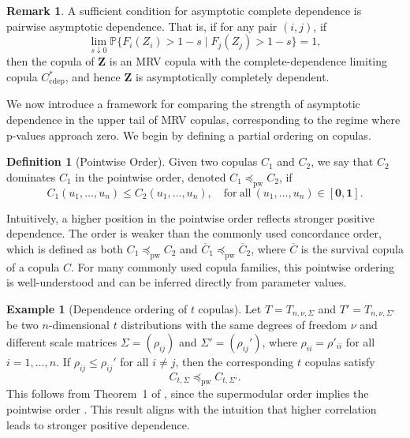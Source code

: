 \documentclass[12pt]{article}
\theoremstyle{plain}
\theoremstyle{plain}
\theoremstyle{definition}
\newtheorem{defn}{Definition}[section]
\newtheorem{exmp}{Example}[section]
\newtheorem{rem}{Remark}[section]
\renewcommand{\Pr}{\mathbb{P}}
\begin{document}
\begin{rem}
A sufficient condition for asymptotic complete dependence is pairwise asymptotic dependence. 
That is, if for any pair $(i,j)$, if
\[
\lim_{s\downarrow0}
\Pr\{F_i(Z_i)>1-s \mid F_j(Z_j)>1-s\}=1,
\]
then the copula of $\mathbf Z$ is an MRV copula with the complete-dependence limiting copula $C^*_{\mathrm{cdep}}$, and hence $\mathbf Z$ is asymptotically completely dependent. 
\end{rem}

We now introduce a framework for comparing the strength of asymptotic dependence in the upper tail of MRV copulas, corresponding to the regime where p-values approach zero. We begin by defining a partial ordering on copulas.


\begin{defn}[Pointwise Order]
\label{def:concord-order-copula}
Given two copulas $C_1$ and $C_2$, we say that $C_2$ dominates $C_1$ in the pointwise order, denoted $C_1 \preceq_{\mathrm{pw}} C_2$,  if
\[
C_1(u_1,\dots,u_n)\le C_2(u_1,\dots,u_n),\quad \mathrm{for~all~}(u_1,\dots,u_n)\in[\mathbf{0},\mathbf{1}].
\]
\end{defn}
Intuitively, a higher position in the pointwise order reflects stronger positive dependence. 
The  order is weaker than the commonly used concordance order, which is defined as both $C_1 \preceq_{\mathrm{pw}} C_2$
and $\overline{C}_1 \preceq_{\mathrm{pw}} \overline{C}_2$, where $\overline{C}$ is the survival copula of a copula $C$. For many commonly used copula families, this pointwise ordering is well-understood and can be inferred directly from parameter values.

\begin{exmp}[Dependence ordering of $t$ copulas]
\label{exmp:t-dependence}
Let $T = T_{n, \nu, \Sigma}$ and $T' = T_{n, \nu, \Sigma'}$ be two $n$-dimensional $t$ distributions with the same degrees of freedom  $\nu$ and different scale matrices $\Sigma = (\rho_{ij})$ and $\Sigma' = (\rho_{ij}')$, where $\rho_{ii}=\rho'_{ii}$ for all $i=1,\dots,n$.  If $\rho_{ij} \le \rho_{ij}'$ for all $i \ne j$, then the corresponding $t$ copulas satisfy
\[
C_{t,\Sigma}\preceq_{\mathrm{pw}} C_{t,\Sigma'}.
\]
This follows from Theorem~1 of \citet{ANSARI2021104709}, since the supermodular order implies the pointwise order \citep{shaked2007stochastic}. This result aligns with the intuition that higher correlation leads to stronger positive dependence.
\end{exmp}
\end{document}
